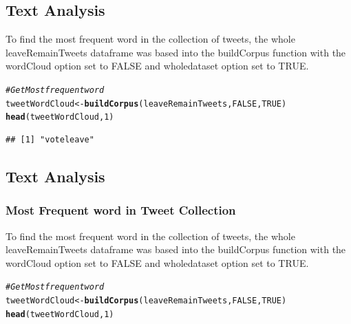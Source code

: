 \documentclass[10pt  ,usenames, dvipsnames]{article}\usepackage[]{graphicx}\usepackage[]{color}
\makeatletter
\newcommand{\hlnum}[1]{\textcolor[rgb]{0.686,0.059,0.569}{#1}}%
\newcommand{\hlcom}[1]{\textcolor[rgb]{0.678,0.584,0.686}{\textit{#1}}}%
\newcommand{\hlstd}[1]{\textcolor[rgb]{0.345,0.345,0.345}{#1}}%
\newcommand{\hlkwb}[1]{\textcolor[rgb]{0.69,0.353,0.396}{#1}}%
\newcommand{\hlkwd}[1]{\textcolor[rgb]{0.737,0.353,0.396}{\textbf{#1}}}%
\newenvironment{kframe}{%
 \def\at@end@of@kframe{}%
 \ifinner\ifhmode%
  \def\at@end@of@kframe{\end{minipage}}%
  \begin{minipage}{\columnwidth}%
 \fi\fi%
 \def\FrameCommand##1{\hskip\@totalleftmargin \hskip-\fboxsep
 \colorbox{shadecolor}{##1}\hskip-\fboxsep
     \hskip-\linewidth \hskip-\@totalleftmargin \hskip\columnwidth}%
 \MakeFramed {\advance\hsize-\width
   \@totalleftmargin\z@ \linewidth\hsize
   \@setminipage}}%
 {\par\unskip\endMakeFramed%
 \at@end@of@kframe}
\newenvironment{knitrout}{}{} %
\makeatother
\begin{document}
\clearpage

\subsection{Text Analysis}

To find the most frequent word in the collection of tweets, the whole leaveRemainTweets dataframe was based into the buildCorpus function with the wordCloud option set to FALSE and wholedataset option set to TRUE.

\begin{knitrout}
\color{fgcolor}\begin{kframe}
\begin{alltt}
\hlcom{#Get Most frequent word}
\hlstd{tweetWordCloud} \hlkwb{<-}\hlkwd{buildCorpus}\hlstd{(leaveRemainTweets,} \hlnum{FALSE}\hlstd{,} \hlnum{TRUE}\hlstd{)}
\hlkwd{head}\hlstd{(tweetWordCloud,}\hlnum{1}\hlstd{)}
\end{alltt}
\end{kframe}
\end{knitrout}


\begin{knitrout}
\color{fgcolor}\begin{kframe}
\begin{verbatim}
## [1] "voteleave"
\end{verbatim}
\end{kframe}
\end{knitrout}

\clearpage

\subsection{Text Analysis}

\subsubsection{Most Frequent word in Tweet Collection}

To find the most frequent word in the collection of tweets, the whole leaveRemainTweets dataframe was based into the buildCorpus function with the wordCloud option set to FALSE and wholedataset option set to TRUE.

\begin{knitrout}
\color{fgcolor}\begin{kframe}
\begin{alltt}
\hlcom{#Get Most frequent word}
\hlstd{tweetWordCloud} \hlkwb{<-}\hlkwd{buildCorpus}\hlstd{(leaveRemainTweets,} \hlnum{FALSE}\hlstd{,} \hlnum{TRUE}\hlstd{)}
\hlkwd{head}\hlstd{(tweetWordCloud,}\hlnum{1}\hlstd{)}
\end{alltt}
\end{kframe}
\end{knitrout}
\end{document}
